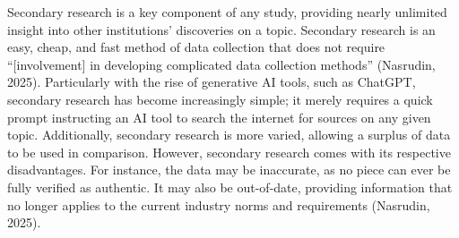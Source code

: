 Secondary research is a key component of any study, providing nearly unlimited insight into other institutions’ discoveries on a topic. Secondary research is an easy, cheap, and fast method of data collection that does not require “[involvement] in developing complicated data collection methods” (Nasrudin, 2025). Particularly with the rise of generative AI tools, such as ChatGPT, secondary research has become increasingly simple; it merely requires a quick prompt instructing an AI tool to search the internet for sources on any given topic. Additionally, secondary research is more varied, allowing a surplus of data to be used in comparison. However, secondary research comes with its respective disadvantages. For instance, the data may be inaccurate, as no piece can ever be fully verified as authentic. It may also be out-of-date, providing information that no longer applies to the current industry norms and requirements (Nasrudin, 2025).
